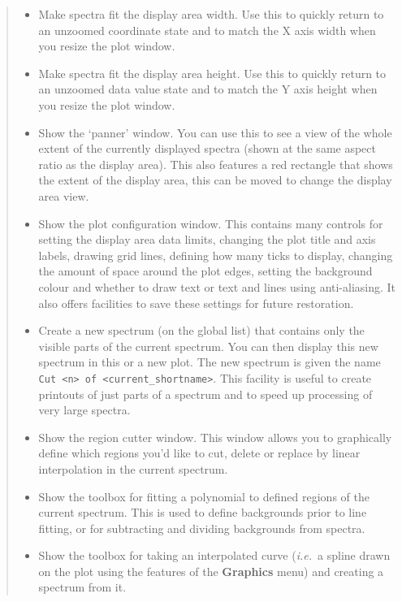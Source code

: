 \documentclass[twoside,11pt,nolof]{starlink}
\providecommand{\inline}[1]
        {\ifpdf
          \texttt{[image: sun243\_figures/\#1]}
          \else
          \texttt{[image: \#1]}
          \fi
        }
\newcommand{\labelitem}[1]{\textbf{#1}}
\providecommand{\hitext}[1]{\texttt{#1}}
\providecommand{\ie}{\textit{i.e.}}
\begin{document}
\begin{quote}
\begin{itemize}
  \item[\inline{fitwidth}] Make spectra fit the display area width.  Use this
  to quickly return to an unzoomed coordinate state and to match the X axis
  width when you resize the plot window.

  \item[\inline{fitheight}] Make spectra fit the display area height.  Use
  this to quickly return to an unzoomed data value state and to match the Y
  axis height when you resize the plot window.

  \item[\inline{panner}] Show the `panner' window. You can use this to
  see a view of the whole extent of the currently displayed spectra
  (shown at the same aspect ratio as the display area). This also
  features a red rectangle that shows the extent of the display area,
  this can be moved to change the display area view.

  \item[\inline{config}] Show the plot configuration window. This
  contains many controls for setting the display area data limits,
  changing the plot title and axis labels, drawing grid lines,
  defining how many ticks to display, changing the amount of space
  around the plot edges, setting the background colour and whether to
  draw text or text and lines using anti-aliasing. It also offers
  facilities to save these settings for future restoration.

  \item[\inline{cutter}] Create a new spectrum (on the global list)
  that contains only the visible parts of the current spectrum. You
  can then display this new spectrum in this or a new plot. The new
  spectrum is given the name \hitext{Cut <n> of <current\_shortname>}.
  This facility is useful to create printouts of just parts of a
  spectrum and to speed up processing of very large spectra.

  \item[\inline{regioncutter}] Show the region cutter window. This
  window allows you to graphically define which regions you'd like to
  cut, delete or replace by linear interpolation in the current spectrum.

  \item[\inline{fitback}] Show the toolbox for fitting a polynomial to
  defined regions of the current spectrum. This is used to define
  backgrounds prior to line fitting, or for subtracting and dividing
  backgrounds from spectra.

  \item[\inline{interpolate}] Show the toolbox for taking an interpolated
  curve (\ie\ a spline drawn on the plot using the features of the
  \labelitem{Graphics} menu) and creating a spectrum from it.


\end{itemize}
\end{quote}
\end{document}
